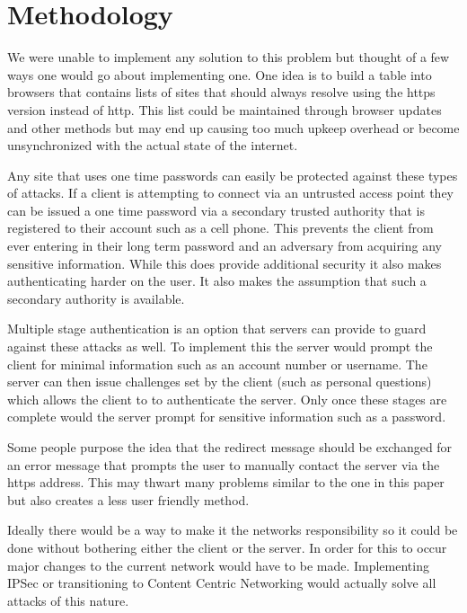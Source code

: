 \documentclass{article}
\begin{document}
\section{Methodology}
We were unable to implement any solution to this problem but thought of a few ways one would go about implementing one.
One idea is to build a table into browsers that contains lists of sites that should always resolve using the https version instead of http.  This list could be maintained through browser updates and other methods but may end up causing too much upkeep overhead or become unsynchronized with the actual state of the internet.

Any site that uses one time passwords can easily be protected against these types of attacks.  If a client is attempting to connect via an untrusted access point they can be issued a one time password via a secondary trusted authority that is registered to their account such as a cell phone.  This prevents the client from ever entering in their long term password and an adversary from acquiring any sensitive information.  While this does provide additional security it also makes authenticating harder on the user.  It also makes the assumption that such a secondary authority is available.

Multiple stage authentication is an option that servers can provide to guard against these attacks as well.  To implement this the server would prompt the client for minimal information such as an account number or username.  The server can then issue challenges set by the client (such as personal questions) which allows the client to to authenticate the server.  Only once these stages are complete would the server prompt for sensitive information such as a password.

Some people purpose the idea that the redirect message should be exchanged for an error message that prompts the user to manually contact the server via the https address.  This may thwart many problems similar to the one in this paper but also creates a less user friendly method.

Ideally there would be a way to make it the networks responsibility so it could be done without bothering either the client or the server.  In order for this to occur major changes to the current network would have to be made.  Implementing IPSec or transitioning to Content Centric Networking would actually solve all attacks of this nature.
\end{document}
